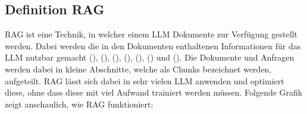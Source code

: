 \documentclass[12pt,toc=bib,toc=listof]{scrreprt}
\begin{document}
\subsection{Definition RAG} %
\label{sec:definitionRAG}
RAG ist eine Technik, in welcher einem LLM Dokumente zur Verfügung gestellt werden. Dabei werden die in den Dokumenten enthaltenen Informationen für das LLM nutzbar gemacht (\cite{Gao2024}), (\cite{Honroth2024}), (\cite{Lewis2021}), (\cite{Miesle2023}), (\cite{Salemi2024}), (\cite{Schmid2024}) und (\cite{Wu2024}). Die Dokumente und Anfragen werden dabei in kleine Abschnitte, welche als Chunks bezeichnet werden, aufgeteilt. RAG lässt sich dabei in sehr vielen LLM anwenden und optimiert diese, ohne dass diese mit viel Aufwand trainiert werden müssen. Folgende Grafik zeigt anschaulich, wie RAG funktioniert:
\end{document}
